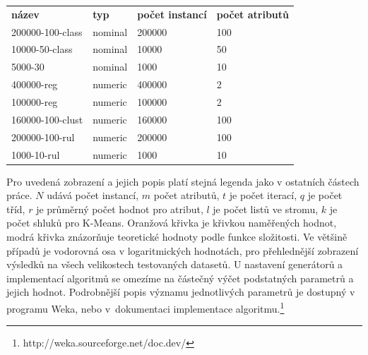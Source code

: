 \documentclass[12pt]{article}
\begin{document}
\newpage
{}
\begin{table}[h]
\begin{tabular}{  p{4.4cm}  p{1.9cm}  p{3.5cm}  p{3.5cm}  }
{\bf název} &  {\bf typ} & {\bf počet instancí} & {\bf počet atributů} \\

200000-100-class &      nominal &                 200000 &        100 \\

10000-50-class &       nominal &                  10000 &         50 \\

5000-30 &          nominal &                   1000 &         10 \\

400000-reg &      numeric &                 400000 &          2 \\

100000-reg &       numeric &                 100000 &          2 \\

160000-100-clust &     numeric &                 160000 &        100 \\

200000-100-rul &      numeric &                 200000 &        100 \\

1000-10-rul &          numeric &                   1000 &         10 \\
\end{tabular}
\end{table}  

Pro uvedená zobrazení a jejich popis platí stejná legenda jako v ostatních částech práce. $N$ udává počet instancí, $m$ počet atributů, $t$ je počet iterací, $q$ je počet tříd, $r$ je průměrný počet hodnot pro atribut, $l$ je počet listů ve stromu, $k$ je počet shluků pro K-Means. 
\newline
\indent
Oranžová křivka je křivkou naměřených hodnot, modrá křivka znázorňuje teoretické hodnoty podle funkce složitosti. Ve většině případů je vodorovná osa v logaritmických hodnotách, pro přehlednější zobrazení výsledků na všech velikostech testovaných datasetů.
\newline
\indent
U nastavení generátorů a implementací algoritmů se omezíme na částečný výčet podstatných parametrů a jejich hodnot. Podrobnější popis významu jednotlivých parametrů je dostupný v programu Weka, nebo v~dokumentaci implementace algoritmu.\footnote{http://weka.sourceforge.net/doc.dev/}
\end{document}
